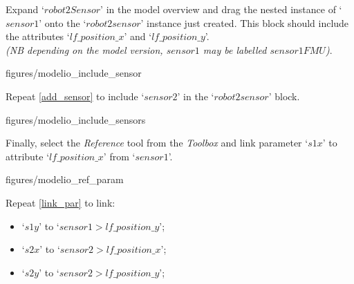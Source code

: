 \documentclass[11pt,a4paper]{../tutorial}
\begin{document}
\begin{instructions}
\newpage

\item \label{add_sensor} Expand `$robot2Sensor$' in the model overview and drag the nested instance of `$sensor1$' onto the `$robot2sensor$' instance just created. This block should include the attributes `$lf\_position\_x$' and `$lf\_position\_y$'. \\ \textit{(NB depending on the model version, $sensor1$  may be labelled $sensor1FMU$)}.

\begin{center}
\begin{annotation}[width=0.7\linewidth]{figures/modelio_include_sensor}
    \end{annotation}
\end{center}

\item Repeat \ref{add_sensor} to include `$sensor2$' in the `$robot2sensor$' block.

\begin{center}
\begin{annotation}[width=0.7\linewidth]{figures/modelio_include_sensors}
    \end{annotation}
\end{center}

\item \label{link_par} Finally, select the \emph{Reference} tool from the \emph{Toolbox} and link parameter `$s1x$' to attribute `$lf\_position\_x$' from `$sensor1$'.

\begin{center}
\begin{annotation}[width=0.7\linewidth]{figures/modelio_ref_param}
    \end{annotation}
\end{center}

\newpage

\item Repeat \ref{link_par} to link:
\begin{itemize}
	\item `$s1y$' to `$sensor1 > lf\_position\_y$';
	\item `$s2x$' to `$sensor2 > lf\_position\_x$';
	\item `$s2y$' to `$sensor2 > lf\_position\_y$';
\end{itemize}


\end{instructions}
\end{document}
